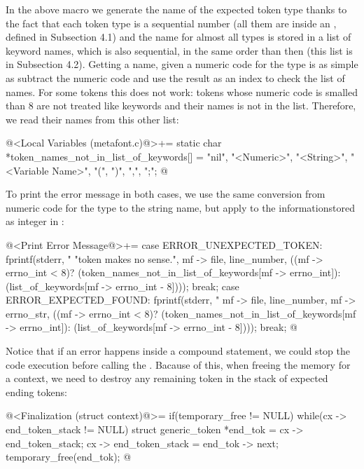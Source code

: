 In the above macro we generate the name of the expected token type
thanks to the fact that each token type is a sequential number (all
them are inside an , defined in Subsection 4.1) and
the name for almost all types is stored in a list of keyword names,
which is also sequential, in the same order than
then  (this list is in Subsection 4.2). Getting a
name, given a numeric code for the type is as simple as subtract the
numeric code and use the result as an index to check the list of
names. For some tokens this does not work: tokens whose numeric code
is smalled than 8 are not treated like keywords and their names is not
in the list. Therefore, we read their names from this other list:

\iniciocodigo
@<Local Variables (metafont.c)@>+=
static char *token_names_not_in_list_of_keywords[] = {
  "nil", "<Numeric>", "<String>", "<Variable Name>", "(", ")", ",", ";"};
@
\fimcodigo


To print the error message in both cases, we use the same conversion
from numeric code for the type to the string name, but apply to the
informationstored as integer in :

\iniciocodigo
@<Print Error Message@>+=
case ERROR_UNEXPECTED_TOKEN:
  fprintf(stderr, "%
          "token makes no sense.", mf -> file, line_number,
          ((mf -> errno_int < 8)?
          (token_names_not_in_list_of_keywords[mf -> errno_int]):
          (list_of_keywords[mf -> errno_int - 8])));
  break;
case ERROR_EXPECTED_FOUND:
  fprintf(stderr, "%
          mf -> file, line_number, mf -> errno_str,
          ((mf -> errno_int < 8)?
          (token_names_not_in_list_of_keywords[mf -> errno_int]):
          (list_of_keywords[mf -> errno_int - 8])));
  break;
@
\fimcodigo

Notice that if an error happens inside a compound statement, we could
stop the code execution before calling
the . Bacause of this, when freeing
the memory for a context, we need to destroy any remaining token in
the stack of expected ending tokens:

\iniciocodigo
@<Finalization (struct context)@>=
if(temporary_free != NULL){
  while(cx -> end_token_stack != NULL){
    struct generic_token *end_tok = cx -> end_token_stack;
    cx -> end_token_stack = end_tok -> next;
    temporary_free(end_tok);
  }  
}
@
\fimcodigo



